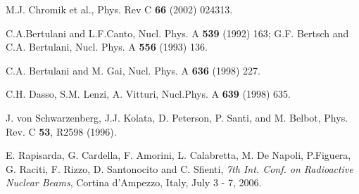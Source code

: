 \documentclass[prc,preprint,showpacs,showkeys,nofootinbib]{revtex4}%
\begin{document}
\begin{thebibliography}{99}
M.J. Chromik et al., Phys. Rev C \textbf{66} (2002)
024313.

C.A.Bertulani and L.F.Canto, Nucl. Phys. A {\bf 539} (1992)
163; G.F. Bertsch and C.A. Bertulani, Nucl. Phys. A {\bf 556} (1993)
136.

 C.A. Bertulani and M. Gai, Nucl. Phys. A {\bf 636} (1998)
227.

 C.H. Dasso, S.M. Lenzi, A. Vitturi, Nucl.Phys. A {\bf 639} (1998) 635.

 J. von Schwarzenberg, J.J. Kolata, D. Peterson, P. Santi, and
M. Belbot, Phys. Rev. C {\bf 53}, R2598 (1996).

 E. Rapisarda, G. Cardella, F. Amorini, L. Calabretta,
M. De Napoli, P.Figuera,  G. Raciti, F. Rizzo, D. Santonocito and C. Sfienti,
{\it 7th Int. Conf. on Radioactive Nuclear Beams}, Cortina d'Ampezzo, Italy,
July 3 - 7, 2006.

\end{thebibliography}
\end{document}
